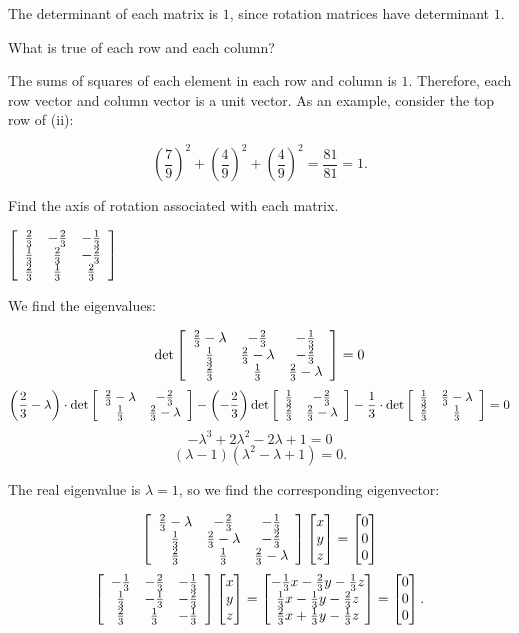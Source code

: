 \documentclass[../key.tex]{subfiles}
\begin{document}
{{The determinant of each matrix is $1$, since rotation matrices have determinant $1$.

\begin{inner_problem}
\item What is true of each row and each column?
\end{inner_problem}

The sums of squares of each element in each row and column is $1$. Therefore, each row vector and column vector is a unit vector. As an example, consider the top row of (ii):

$$\left(\frac{7}{9}\right)^2+\left(\frac{4}{9}\right)^2+\left(\frac{4}{9}\right)^2 = \frac{81}{81} = 1.$$

\begin{inner_problem}
\item Find the axis of rotation associated with each matrix.
\end{inner_problem}

\begin{iinner_problem}[start=1]
\item $\left[\begin{array}{ccc} \frac{2}{3} & -\frac{2}{3} & -\frac{1}{3} \\ \frac{1}{3} & \frac{2}{3} & -\frac{2}{3} \\ \frac{2}{3} & \frac{1}{3} & \frac{2}{3} \end{array}\right]$
\end{iinner_problem}

We find the eigenvalues:

$$\det \left[\begin{array}{ccc} \frac{2}{3}-\lambda & -\frac{2}{3} & -\frac{1}{3} \\ \frac{1}{3} & \frac{2}{3}-\lambda & -\frac{2}{3} \\ \frac{2}{3} & \frac{1}{3} & \frac{2}{3}-\lambda \end{array}\right] = 0$$
$$\left(\frac{2}{3}-\lambda\right)\cdot\det \left[\begin{array}{cc} \frac{2}{3}-\lambda & -\frac{2}{3} \\ \frac{1}{3} & \frac{2}{3}-\lambda \end{array}\right] - \left(-\frac{2}{3}\right)\det \left[\begin{array}{cc} \frac{1}{3} & -\frac{2}{3} \\ \frac{2}{3} & \frac{2}{3}-\lambda \end{array}\right] - \frac{1}{3} \cdot \det \left[\begin{array}{cc} \frac{1}{3} & \frac{2}{3}-\lambda \\ \frac{2}{3} & \frac{1}{3} \end{array}\right]=0$$
$$-\lambda^3 + 2 \lambda^2 - 2 \lambda + 1=0$$
$$(\lambda - 1)(\lambda^2 - \lambda + 1)=0.$$

The real eigenvalue is $\lambda = 1$, so we find the corresponding eigenvector:

$$\left[\begin{array}{ccc} \frac{2}{3}-\lambda & -\frac{2}{3} & -\frac{1}{3} \\ \frac{1}{3} & \frac{2}{3}-\lambda & -\frac{2}{3} \\ \frac{2}{3} & \frac{1}{3} & \frac{2}{3}-\lambda \end{array}\right]\begin{bmatrix} x \\ y \\ z \end{bmatrix} = \begin{bmatrix} 0 \\ 0 \\ 0 \end{bmatrix}$$
$$\left[\begin{array}{ccc} -\frac{1}{3} & -\frac{2}{3} & -\frac{1}{3} \\ \frac{1}{3} & -\frac{1}{3} & -\frac{2}{3} \\ \frac{2}{3} & \frac{1}{3} & -\frac{1}{3} \end{array}\right]\begin{bmatrix} x \\ y \\ z \end{bmatrix} = \begin{bmatrix} -\frac{1}{3}x -\frac{2}{3}y - \frac{1}{3}z \\ \frac{1}{3}x-\frac{1}{3}y-\frac{2}{3}z \\ \frac{2}{3}x + \frac{1}{3}y - \frac{1}{3}z \end{bmatrix} = \begin{bmatrix} 0 \\ 0 \\ 0 \end{bmatrix}.$$

}}
\end{document}
